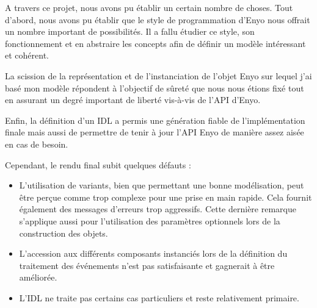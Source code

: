 \documentclass[11pt,a4paper]{report}
\begin{document}
A travers ce projet, nous avons pu établir un certain nombre de choses.
Tout d'abord, nous avons pu établir que le style de programmation d'Enyo nous offrait
un nombre important de possibilités. Il a fallu étudier ce style, son fonctionnement et 
en abstraire les concepts afin de définir un modèle intéressant et cohérent.

La scission de la représentation et de l'instanciation de l'objet Enyo sur lequel j'ai basé mon modèle
répondent à l'objectif de sûreté que nous nous étions fixé tout en assurant un degré important
de liberté vis-à-vis de l'API d'Enyo.

Enfin, la définition d'un IDL a permis une génération fiable de l'implémentation finale mais aussi de 
permettre de tenir à jour l'API Enyo de manière assez aisée en cas de besoin.

Cependant, le rendu final subit quelques défauts : 
\begin{itemize}
\item L'utilisation de variants, bien que permettant 
  une bonne modélisation, peut être perçue comme trop complexe pour une prise en main rapide. Cela fournit
  également des messages d'erreurs trop aggressifs. 
  Cette dernière remarque s'applique aussi pour l'utilisation des paramètres optionnels lors de la
  construction des objets.
\item L'accession aux différents composants instanciés lors de la définition du traitement 
  des événements n'est pas satisfaisante et gagnerait à être améliorée.
\item L'IDL ne traite pas certains cas particuliers et reste relativement primaire.    
\end{itemize}\medskip
\end{document}
